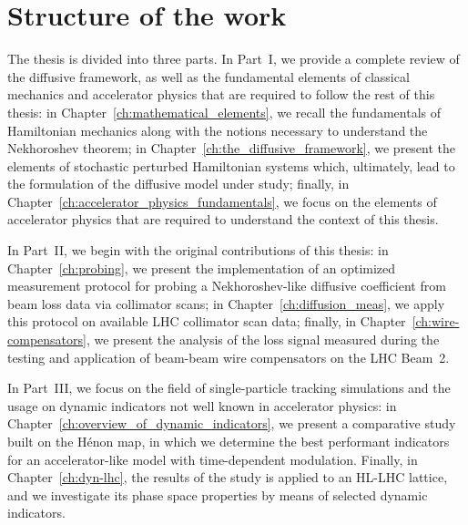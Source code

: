 \section*{Structure of the work}

The thesis is divided into three parts. In Part~I, we provide a complete review of the diffusive framework, as well as the fundamental elements of classical mechanics and accelerator physics that are required to follow the rest of this thesis: in Chapter~\ref{ch:mathematical_elements}, we recall the fundamentals of Hamiltonian mechanics along with the notions necessary to understand the Nekhoroshev theorem; in Chapter~\ref{ch:the_diffusive_framework}, we present the elements of stochastic perturbed Hamiltonian systems which, ultimately, lead to the formulation of the diffusive model under study; finally, in Chapter~\ref{ch:accelerator_physics_fundamentals}, we focus on the elements of accelerator physics that are required to understand the context of this thesis.

In Part~II, we begin with the original contributions of this thesis: in Chapter~\ref{ch:probing}, we present the implementation of an optimized measurement protocol for probing a Nekhoroshev-like diffusive coefficient from beam loss data via collimator scans; in Chapter~\ref{ch:diffusion_meas}, we apply this protocol on available LHC collimator scan data; finally, in Chapter~\ref{ch:wire-compensators}, we present the analysis of the loss signal measured during the testing and application of beam-beam wire compensators on the LHC Beam~2.

In Part~III, we focus on the field of single-particle tracking simulations and the usage on dynamic indicators not well known in accelerator physics: in Chapter~\ref{ch:overview_of_dynamic_indicators}, we present a comparative study built on the Hénon map, in which we determine the best performant indicators for an accelerator-like model with time-dependent modulation. Finally, in Chapter~\ref{ch:dyn-lhc}, the results of the study is applied to an HL-LHC lattice, and we investigate its phase space properties by means of selected dynamic indicators.




